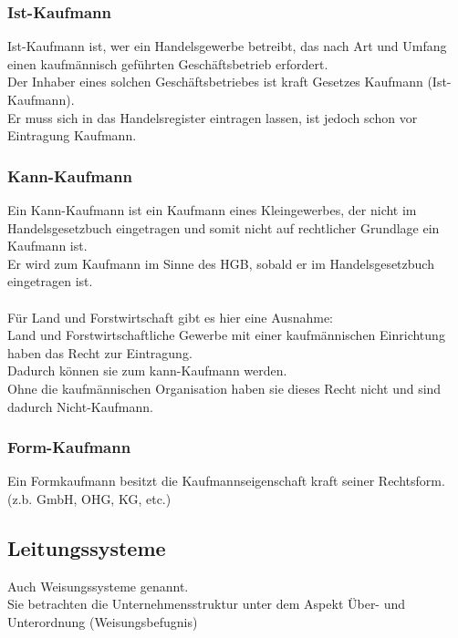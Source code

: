 \documentclass[10pt]{article}
\begin{document}
\subsubsection{Ist-Kaufmann}
Ist-Kaufmann ist, wer ein Handelsgewerbe betreibt, das nach Art und Umfang einen kaufmännisch geführten Geschäftsbetrieb erfordert. \\
Der Inhaber eines solchen Geschäftsbetriebes ist kraft Gesetzes Kaufmann (Ist-Kaufmann). \\
Er muss sich in das Handelsregister eintragen lassen, ist jedoch schon vor Eintragung Kaufmann.

\subsubsection{Kann-Kaufmann}
Ein Kann-Kaufmann ist ein Kaufmann eines Kleingewerbes, der nicht im Handelsgesetzbuch eingetragen und somit nicht auf rechtlicher Grundlage ein Kaufmann ist. \\
Er wird zum Kaufmann im Sinne des HGB, sobald er im Handelsgesetzbuch eingetragen ist. \\ \\
Für Land und Forstwirtschaft gibt es hier eine Ausnahme: \\
Land und Forstwirtschaftliche Gewerbe mit einer kaufmännischen Einrichtung haben das Recht zur Eintragung. \\
Dadurch können sie zum kann-Kaufmann werden. \\
Ohne die kaufmännischen Organisation haben sie dieses Recht nicht und sind dadurch Nicht-Kaufmann.

\subsubsection{Form-Kaufmann}
Ein Formkaufmann besitzt die Kaufmannseigenschaft kraft seiner Rechtsform. \\
(z.b. GmbH, OHG, KG, etc.)

\subsection{Leitungssysteme}
Auch Weisungssysteme genannt. \\
Sie betrachten die Unternehmensstruktur unter dem Aspekt \"Uber- und Unterordnung (Weisungsbefugnis)
\end{document}
